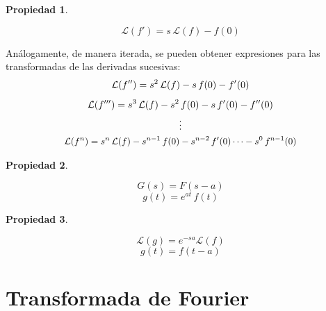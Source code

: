 \documentclass[a5paper,12pt,twoside]{book}
\newtheorem{prop}{{Propiedad}}[chapter]
\begin{document}
\begin{mdframed}[style=PropertyFrame]
    \begin{prop}
    \end{prop}
    \begin{equation*}
        \mathcal{L}(f') = s \, \mathcal{L}(f) - f(0)
    \end{equation*}
\end{mdframed}

Análogamente, de manera iterada, se pueden obtener expresiones para las transformadas de las derivadas sucesivas:
\begin{gather*}
    \mathcal{L}(f'') = s^2 \, \mathcal{L}(f) - s \, f(0) - f'(0)
    \\[1ex]
    \mathcal{L}(f''') = s^3 \, \mathcal{L}(f) - s^2 \, f(0) - s \, f'(0) - f''(0)
    \\
    \vdots
    \\
    \scale{0.95}{
    \mathcal{L}(f^n) = s^\nth \,\mathcal{L}(f) - s^{\nth-1} \, f(0) - s^{\nth-2} \, f'(0) \dots - s^0 \, f^{\nth-1}(0)
    }
\end{gather*}

\begin{mdframed}[style=PropertyFrame]
    \begin{prop}
    \end{prop}
    \begin{equation*}
        G(s) = F(s-a)
    \end{equation*}
    \begin{equation*}
        g(t) = e^{at} \, f(t)
    \end{equation*}
\end{mdframed}

\begin{mdframed}[style=PropertyFrame]
    \begin{prop}
    \end{prop}
    \begin{equation*}
        \mathcal{L}(g)=e^{-sa}\mathcal{L}(f)
    \end{equation*}
    \begin{equation*}
        g(t) = f(t-a)
    \end{equation*}
\end{mdframed}


\section{Transformada de Fourier}
\end{document}
